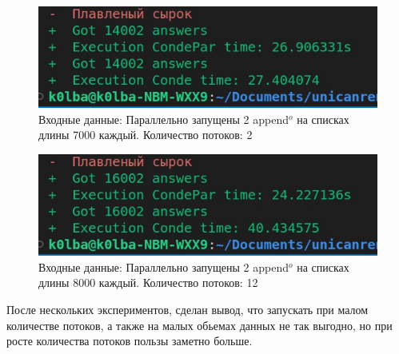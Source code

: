 \begin{figure}[h]

  \centering
  
  \includegraphics[width=0.8\linewidth]{1test.jpg}
  
  \caption{Входные данные: Параллельно запущены 2 append$^o$ на списках длины 7000 каждый.
  Количество потоков: 2}
  
  \label{fig:mpr}
  
\end{figure}
\begin{figure}[h]

  \centering
    
  \includegraphics[width=0.8\linewidth]{2test.jpg}
    
  \caption{Входные данные: Параллельно запущены 2 append$^o$ на списках длины 8000 каждый.
  Количество потоков: 12}
    
  \label{fig:mpr}
    
\end{figure}

После нескольких экспериментов, сделан вывод, что запускать при малом количестве потоков, а также на малых обьемах данных не так выгодно, но при росте количества потоков пользы заметно больше.

